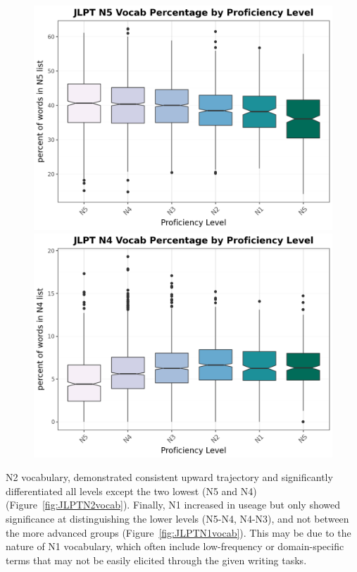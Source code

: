\begin{figure}[htbp]
    \centering
    \begin{minipage}{.48\textwidth}
        \centering
    \includegraphics[scale=.4]{img/LFP/JLPT_N5}
    \caption[Percentage of tokens used from JLPT N5 List]{}
        \label{fig:JLPTN5vocab}
    \end{minipage}
    \hfill
\begin{minipage}{.48\textwidth}
        \centering
        \includegraphics[scale=.4]{img/LFP/JLPT_N4}
        \caption[Percentage of tokens used from JLPT N4 List]{}
\label{fig:JLPTN4vocab}
\end{minipage}
    \end{figure}
N2 vocabulary, demonstrated consistent upward trajectory and significantly differentiated all levels
except the two lowest (N5 and N4) (Figure~\ref{fig:JLPTN2vocab}). Finally, N1 increased in useage but only showed 
significance at
distinguishing
the lower levels (N5-N4, N4-N3), and not between the more advanced groups (Figure~\ref{fig:JLPTN1vocab}). This 
may be due to the nature
of N1 vocabulary, which often include low-frequency or domain-specific terms that may not be easily elicited 
through the given writing tasks. 

